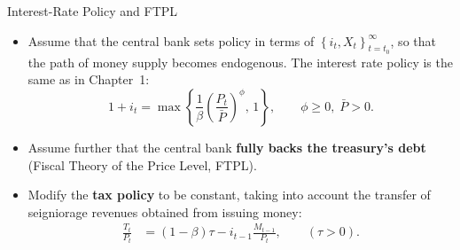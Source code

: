 \documentclass[11pt,aspectratio=169]{beamer}
\begin{document}
\begin{frame}{Interest-Rate Policy and FTPL}

\begin{itemize}

    \item Assume that the central bank sets policy in terms of 
    $\left\{ i_t, X_t \right\}_{t=t_0}^\infty$, 
    so that the path of money supply becomes endogenous. 
    The interest rate policy is the same as in Chapter~1:
    \begin{equation*}
        1 + i_t = 
        \max \left\{
            \frac{1}{\beta}
            \left( \frac{P_t}{\bar{P}} \right)^{\!\phi},\,
            1
        \right\},
        \qquad \phi \ge 0, \; \bar{P} > 0.
    \end{equation*}

    \vspace{0.6em}

    \item Assume further that the central bank \textbf{fully backs the treasury’s debt} (Fiscal Theory of the Price Level, FTPL).

    \vspace{0.6em}

    \item Modify the \textbf{tax policy} to be constant, taking into account the transfer of seigniorage revenues obtained from issuing money:
    \begin{align}
        \frac{T_t}{P_t} 
        &= (1 - \beta)\tau 
        - i_{t-1}\frac{M_{t-1}}{P_t},
        \qquad (\tau > 0).
        \label{taxpolicy}
    \end{align}

\end{itemize}

\end{frame}
\end{document}
